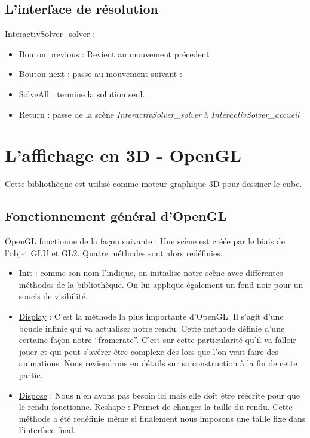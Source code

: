 \subsection{L'interface de résolution}
\underline{InteractivSolver\_solver :}
\begin{itemize}
    \item Bouton previous : Revient au mouvement précedent
    \item Bouton next : passe au mouvement suivant :
    \item SolveAll : termine la solution seul.
    \item Return : passe de la scène \textit{InteractivSolver\_solver} à \textit{InteractivSolver\_accueil}
\end{itemize}

\section{L'affichage en 3D - OpenGL}

Cette bibliothèque est utilisé comme moteur graphique 3D pour dessiner le cube.

\subsection{Fonctionnement général d'OpenGL}
OpenGL fonctionne de la façon suivante :
	Une scène est créée par le biais de l’objet GLU et GL2.
	Quatre méthodes sont alors redéfinies.

\begin{itemize}
    \item \underline{Init} : comme son nom l’indique, on initialise notre scène avec différentes méthodes de la bibliothèque. On lui applique également un fond noir pour un soucis de visibilité.

    \item \underline{Display} : C’est la méthode la plus importante d’OpenGL. Il s’agit d’une boucle infinie qui va actualiser notre rendu. Cette méthode définie d’une certaine façon notre “framerate”.
C’est sur cette particularité qu’il va falloir jouer et qui peut s’avérer être complexe dès lors que l’on veut faire des animations. Nous reviendrons en détails sur sa construction à la fin de cette partie.

\item \underline{Dispose}  : Nous n’en avons pas besoin ici mais elle doit être réécrite pour que le rendu fonctionne.
Reshape : Permet de changer la taille du rendu. Cette méthode a été redéfinie même si finalement nous imposons une taille fixe dans l’interface final.

\end{itemize}

